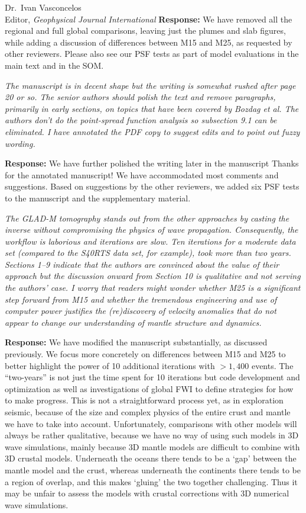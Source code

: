 \documentclass[11pt,a4paper]{letter}
\newcommand{\response}[1]{\textbf{Response:} #1}
\newcommand{\rev}[1]{{\it{#1}}}
\begin{document}
\begin{letter}{Dr.~Ivan Vasconcelos\\
Editor, \textit{Geophysical Journal International}}
\response{We have removed all the regional and full global comparisons, leaving just the plumes and slab figures, while adding a discussion of differences between M15 and M25, as requested by other reviewers. Please also see our PSF tests as part of model evaluations in the main text and in the SOM.}

\rev{The manuscript is in decent shape but the writing is somewhat rushed after page 20 or so. The senior authors should polish the text and remove paragraphs, primarily in early sections, on topics that have been covered by Bozdag et al.
The authors don't do the point-spread function analysis so subsection 9.1 can be eliminated. I have annotated the PDF copy to suggest edits and to point out fuzzy wording.
}

\response{We have further polished the writing later in the manuscript
Thanks for the annotated manuscript! We have accommodated most comments and suggestions.
Based on suggestions by the other reviewers,
we added six PSF tests to the manuscript and the supplementary material.}

\rev{The GLAD-M tomography stands out from the other approaches by casting the inverse without compromising the physics of wave propagation. Consequently, the workflow is laborious and iterations are slow. Ten iterations for a moderate data set (compared to the S40RTS data set, for example), took more than two years. Sections 1--9 indicate that the authors are convinced about the value of their approach but the discussion onward from Section 10 is qualitative and not serving the authors' case.
I worry that readers might wonder whether M25 is a significant step forward from M15 and whether the tremendous engineering and use of computer power justifies the (re)discovery of velocity anomalies that do not appear to change our understanding of mantle structure and dynamics.
}

\response{We have modified the manuscript substantially, as discussed previously. We focus more concretely on differences between M15 and M25 to better highlight the power of 10 additional iterations with $>1,400$ events. The ``two-years'' is not just the time spent for 10 iterations but code development and optimization as well as investigations of global FWI to define strategies for how to make progress. This is not a straightforward process yet, as in exploration seismic, because of the size and complex physics of the entire crust and mantle we have to take into account.
Unfortunately,
comparisons with other models will always be rather qualitative, because we have no way of using such models in 3D wave simulations, mainly because 3D mantle models are difficult to combine with 3D crustal models. Underneath the oceans there tends to be a `gap' between the mantle model and the crust, whereas underneath the continents there tends to be a region of overlap, and this makes `gluing' the two together challenging. Thus it may be unfair to assess the models with crustal corrections with 3D numerical wave simulations.}


\end{letter}
\end{document}
